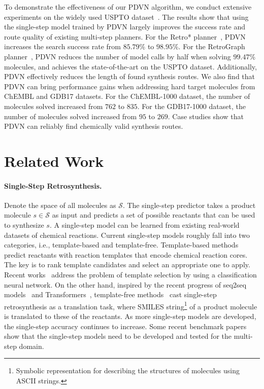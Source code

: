 \documentclass[nohyperref]{article}
\theoremstyle{plain}
\theoremstyle{definition}
\theoremstyle{remark}
\begin{document}
To demonstrate the effectiveness of our PDVN algorithm, we conduct extensive experiments on the widely used USPTO dataset~\cite{lowe2012extraction, chen20retrostar}. 
The results show that using the single-step model trained by PDVN largely improves the success rate and route quality of existing multi-step planners.
For the Retro* planner~\cite{chen20retrostar}, PDVN increases the search success rate from $85.79\%$ to $98.95\%$.
For the RetroGraph planner~\cite{xie2022retrograph}, PDVN reduces the number of model calls by half when solving $99.47\%$ molecules, 
and achieves the state-of-the-art on the USPTO dataset.
Additionally, PDVN effectively 
reduces the length of found synthesis routes. 
We also find that PDVN can bring performance gains when addressing hard target molecules from ChEMBL and GDB17 datasets. 
For the ChEMBL-1000 dataset, the number of molecules solved increased from $762$ to $835$.
For the GDB17-1000 dataset, the number of molecules solved increased from $95$ to $269$. 
Case studies show that PDVN can reliably find chemically valid synthesis routes.  






\section{Related Work}

\paragraph{Single-Step Retrosynthesis.}
Denote the space of all molecules as $\mathcal{S}$. 
The single-step predictor takes a product molecule $s \in \mathcal{S}$ as input and predicts a set of possible reactants that can be used to synthesize $s$.
A single-step model can be learned from existing real-world datasets of chemical reactions.  
Current single-step models roughly fall into two categories, i.e., template-based and template-free.
Template-based methods predict reactants with reaction templates that encode chemical reaction cores. 
The key is to rank template candidates and select an appropriate one to apply.
Recent works~\cite{segler2017neural, coley2017retrosim, dai2019retrosynthesis, shuan2021localretro} address the problem of template selection by using a classification neural network.
On the other hand, inspired
by the recent progress of seq2seq models~\cite{sutskever2014sequence} and Transformers~\cite{vaswani2017attention},
template-free methods~\cite{liu2017s2s, tetko2020state} cast single-step retrosynthesis as a translation task, where SMILES string\footnote{Symbolic representation for describing the structures of molecules using ASCII strings.} of a product molecule is translated to these of the reactants.
As more single-step models are developed, the single-step accuracy continues to increase. 
Some recent benchmark papers~\cite{hassen2022mind, tu2022retrosynthesis} show that the single-step models need to be developed and tested for the multi-step domain.
\end{document}
